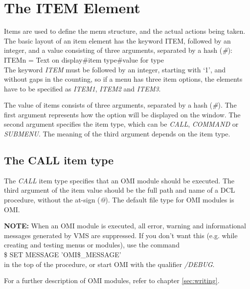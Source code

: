 \documentclass[a4paper]{book}
\newcommand{\vs}{\vspace{3mm}}
\renewcommand{\indent}{\hspace*{5mm}}
\begin{document}
\section{The ITEM Element}
\label{subsec:mylabel4}

Items are used to define the menu structure, and the actual actions being 
taken. The basic layout of an item element has the keyword ITEM, followed by 
an integer, and a value consisting of three arguments, separated by a hash 
(\textsl{{\#}}): \\
\indent\textsf{ITEMn = Text on display{\#}item type{\#}value for type} \\
The keyword \textsl{ITEM} must be followed by an integer, starting with `1', and 
without gaps in the counting, so if a menu has three item options, the 
elements have to be specified as \textsl{ITEM1}, \textsl{ITEM2} and \textsl{ITEM3}.

\vs

The value of items consists of three arguments, separated by a hash (\textsl{{\#}}). 
The first argument represents how the option will be displayed on the 
window. The second argument specifies the item type, which can be \textsl{CALL}, 
\textsl{COMMAND} or \textsl{SUBMENU}. The meaning of the third argument depends on the item 
type.

\subsection{The CALL item type}
\label{subsubsec:mylabel34}

The \textsl{CALL} item type specifies that an OMI 
module should be executed. The third argument of the item value should be 
the full path and name of a DCL procedure, without the at-sign (\textsl{@}). The 
default file type for OMI modules is OMI.

\vs

\hspace{-8mm}\textbf{NOTE:} When an OMI module is executed, all error, warning and 
informational messages generated by VMS are suppressed. If you don't want 
this (e.g. while creating and testing menus or modules), use the command \\
\indent\textsf{{\$} SET MESSAGE 'OMI{\$}{\_}MESSAGE'} \\
in the top of the procedure, or start OMI with the qualifier 
\textsl{/DEBUG}.

For a further description of OMI modules, refer to chapter \ref{sec:writing}.
\end{document}

